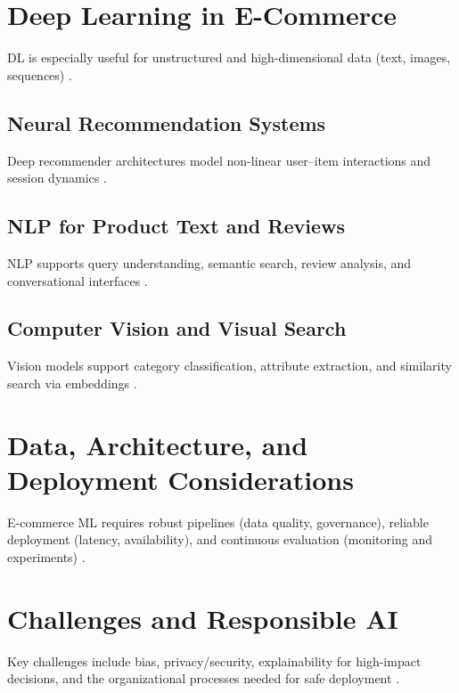 \section{Deep Learning in E-Commerce}
DL is especially useful for unstructured and high-dimensional data (text, images, sequences) \citep{goodfellow2016dl}.

\subsection{Neural Recommendation Systems}
Deep recommender architectures model non-linear user--item interactions and session dynamics \citep{covington2016youtube,hidasi2016gru4rec}.

\subsection{NLP for Product Text and Reviews}
NLP supports query understanding, semantic search, review analysis, and conversational interfaces \citep{jurafsky2023slp}.

\subsection{Computer Vision and Visual Search}
Vision models support category classification, attribute extraction, and similarity search via embeddings \citep{goodfellow2016dl}.

\section{Data, Architecture, and Deployment Considerations}
E-commerce ML requires robust pipelines (data quality, governance), reliable deployment (latency, availability), and continuous evaluation (monitoring and experiments) \citep{kleppmann2017ddia}.

\section{Challenges and Responsible AI}
Key challenges include bias, privacy/security, explainability for high-impact decisions, and the organizational processes needed for safe deployment \citep{laudon2024ecommerce,kleppmann2017ddia}.

